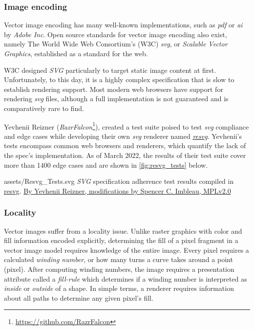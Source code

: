 \subsubsection{Image encoding}\label{sec:image_encoding}
Vector image encoding has many well-known implementations, such as \textit{pdf} or \textit{ai} by \textit{Adobe Inc}. Open source standards for vector image encoding also exist, namely The World Wide Web Consortium's (W3C) \textit{svg}, or \textit{Scalable Vector Graphics}, established as a standard for the web.\medskip

W3C designed \textit{SVG} particularly to target static image content at first. Unfortunately, to this day, it is a highly complex specification that is slow to establish rendering support. Most modern web browsers have support for rendering \textit{svg} files, although a full implementation is not guaranteed and is comparatively rare to find.\medskip

Yevhenii Reizner (\textit{RazrFalcon}\footnote{\href{https://github.com/RazrFalcon}{https://github.com/RazrFalcon}}), created a test suite poised to test \textit{svg} compliance and edge cases while developing their own \textit{svg} renderer named \href{https://github.com/RazrFalcon/resvg}{\textit{resvg}}. Yevhenii's tests encompass common web browsers and renderers, which quantify the lack of the spec's implementation\cite{Resvg}. As of March 2022, the results of their test suite cover more than 1400 edge cases and are shown in \cref{fig:resvg_tests} below.\medskip

\widesvg
{assets/Resvg_Tests.svg}
{\label{fig:resvg_tests}\textit{SVG} specification adherence test results compiled in \href{https://github.com/RazrFalcon/resvg/tree/5e8c634457a70f9ac2656dc59e40da841a8fbe9b}{ resvg}.}
{\href{https://github.com/RazrFalcon/resvg/tree/5e8c634457a70f9ac2656dc59e40da841a8fbe9b\#svg-support}{By Yevhenii Reizner, modifications by Spencer C. Imbleau, MPLv2.0}}

\subsubsection{Locality}\label{sec:locality}
Vector images suffer from a locality issue. Unlike raster graphics with color and fill information encoded explicitly, determining the fill of a pixel fragment in a vector image model requires knowledge of the entire image. Every pixel requires a calculated \textit{winding number}, or how many turns a curve takes around a point (pixel). After computing winding numbers, the image requires a presentation attribute called a \textit{fill-rule} which determines if a winding number is interpreted as \emph{inside} or \emph{outside} of a shape. In simple terms, a renderer requires information about all paths to determine any given pixel's fill.

